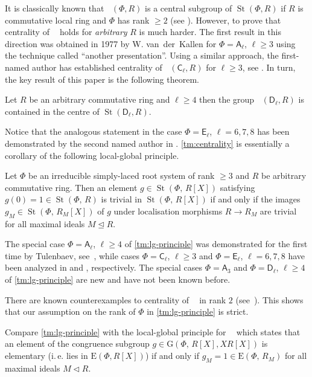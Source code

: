 \documentclass[11pt]{amsart}
\theoremstyle{plain} \declaretheorem[name=Theorem, Refname={Theorem,Theorems}]{tm} \Crefname{tm}{Theorem}{Theorems}
\numberwithin{equation}{section}
\theoremstyle{definition} \newtheorem{df}[lm]{Definition} \Crefname{df}{Definition}{Definitions}
\theoremstyle{remark} \newtheorem{rk}[lm]{Remark} \Crefname{rk}{Remark}{Remarks}
\newcommand{\E}{{\mathrm{E}}}
\newcommand{\GG}{{\mathrm{G}}}
\newcommand{\St}{\mathop{\mathrm{St}}\nolimits}
\newcommand{\Kt}{\mathop{\mathrm{K_2}}\nolimits}
\newcommand{\Ko}{\mathop{\mathrm{K_1}}\nolimits}
\newcommand{\rA}{\mathsf{A}}
\newcommand{\rC}{\mathsf{C}}
\newcommand{\rD}{\mathsf{D}}
\newcommand{\rE}{\mathsf{E}}
\begin{document}
It is classically known that $\Kt(\Phi, R)$ is a central subgroup of $\St(\Phi, R)$ if $R$ is commutative local ring and $\Phi$ has rank $\geq 2$ (see \cite{St73}).
However, to prove that centrality of $\Kt$ holds for \emph{arbitrary} $R$ is much harder.
The first result in this direction was obtained in 1977 by W. van~der~Kallen for $\Phi=\rA_\ell$, $\ell\geq 3$ using the technique called ``another presentation''.
Using a similar approach, the first-named author has established centrality of $\Kt(\rC_\ell, R)$ for $\ell\geq 3$, see \cite{Lav}.
In turn, the key result of this paper is the following theorem.
\begin{tm}\label{tm:centrality}  Let $R$ be an arbitrary commutative ring and $\ell\geq 4$ then 
the group $\Kt(\rD_\ell, R)$ is contained in the centre of $\St(\rD_\ell, R)$. \end{tm}
Notice that the analogous statement in the case $\Phi=\rE_\ell$, $\ell=6,7,8$ has been demonstrated by the second named author in \cite{SCh}.
\cref{tm:centrality} is essentially a corollary of the following local-global principle.
\begin{tm}\label{tm:lg-principle} Let $\Phi$ be an irreducible simply-laced root system of rank $\geq 3$ and $R$ be arbitrary commutative ring.
Then an element $g\in\St(\Phi,\,R[X])$ satisfying $g(0)=1\in\St(\Phi,\,R)$ is trivial in $\St(\Phi,\,R[X])$
if and only if the images $g_M\in\St(\Phi,\,R_M[X])$ of $g$ under localisation morphisms $R\to R_M$ are trivial for all maximal ideals $M\trianglelefteq R$. \end{tm} 

The special case $\Phi=\rA_\ell$, $\ell\geq 4$ of \cref{tm:lg-principle} was demonstrated for the first time by Tulenbaev, see~\cite[Theorem~2.1]{Tul},
while cases $\Phi=\rC_\ell$, $\ell\geq 3$ and $\Phi=\rE_\ell$, $\ell=6,7,8$ have been analyzed in \cite{Lav2} and \cite{SCh}, respectively.
The special cases $\Phi=\rA_3$ and $\Phi=\rD_\ell$, $\ell\geq 4$ of \cref{tm:lg-principle} are new and have not been known before.

There are known counterexamples to centrality of $\Kt$ in rank $2$ (see~\cite{W}).
This shows that our assumption on the rank of $\Phi$ in \cref{tm:lg-principle} is strict.

Compare \cref{tm:lg-principle} with the local-global principle for $\Ko$ which states that an element of the congruence subgroup $g\in \GG(\Phi,\,R[X], XR[X])$ is elementary
(i.\,e. lies in $\E(\Phi, R[X])$) if and only if $g_M=1\in\E(\Phi,\,R_M)$ for all maximal ideals $M \triangleleft R$.
\end{document}
